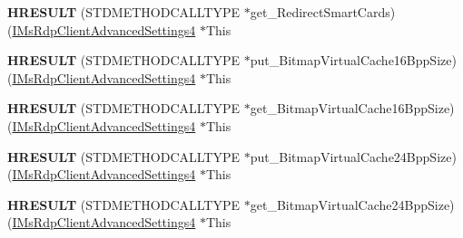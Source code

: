 \begin{DoxyCompactItemize}
{\bfseries H\+R\+E\+S\+U\+LT} (S\+T\+D\+M\+E\+T\+H\+O\+D\+C\+A\+L\+L\+T\+Y\+PE $\ast$get\+\_\+\+Redirect\+Smart\+Cards)(\hyperlink{interface_m_s_t_s_c_lib_1_1_i_ms_rdp_client_advanced_settings4}{I\+Ms\+Rdp\+Client\+Advanced\+Settings4} $\ast$This
\item 
\mbox{\label{struct_m_s_t_s_c_lib_1_1_i_ms_rdp_client_advanced_settings4_vtbl_a013f20454c59a02349435050022f8f77}} 
{\bfseries H\+R\+E\+S\+U\+LT} (S\+T\+D\+M\+E\+T\+H\+O\+D\+C\+A\+L\+L\+T\+Y\+PE $\ast$put\+\_\+\+Bitmap\+Virtual\+Cache16\+Bpp\+Size)(\hyperlink{interface_m_s_t_s_c_lib_1_1_i_ms_rdp_client_advanced_settings4}{I\+Ms\+Rdp\+Client\+Advanced\+Settings4} $\ast$This
\item 
\mbox{\label{struct_m_s_t_s_c_lib_1_1_i_ms_rdp_client_advanced_settings4_vtbl_a509b756a4567d59ac18cf784befe74cb}} 
{\bfseries H\+R\+E\+S\+U\+LT} (S\+T\+D\+M\+E\+T\+H\+O\+D\+C\+A\+L\+L\+T\+Y\+PE $\ast$get\+\_\+\+Bitmap\+Virtual\+Cache16\+Bpp\+Size)(\hyperlink{interface_m_s_t_s_c_lib_1_1_i_ms_rdp_client_advanced_settings4}{I\+Ms\+Rdp\+Client\+Advanced\+Settings4} $\ast$This
\item 
\mbox{\label{struct_m_s_t_s_c_lib_1_1_i_ms_rdp_client_advanced_settings4_vtbl_a2e73d1667290c680a281f8ad2b535bf1}} 
{\bfseries H\+R\+E\+S\+U\+LT} (S\+T\+D\+M\+E\+T\+H\+O\+D\+C\+A\+L\+L\+T\+Y\+PE $\ast$put\+\_\+\+Bitmap\+Virtual\+Cache24\+Bpp\+Size)(\hyperlink{interface_m_s_t_s_c_lib_1_1_i_ms_rdp_client_advanced_settings4}{I\+Ms\+Rdp\+Client\+Advanced\+Settings4} $\ast$This
\item 
\mbox{\label{struct_m_s_t_s_c_lib_1_1_i_ms_rdp_client_advanced_settings4_vtbl_a67d1028c7d84a307bac8b804546fde8c}} 
{\bfseries H\+R\+E\+S\+U\+LT} (S\+T\+D\+M\+E\+T\+H\+O\+D\+C\+A\+L\+L\+T\+Y\+PE $\ast$get\+\_\+\+Bitmap\+Virtual\+Cache24\+Bpp\+Size)(\hyperlink{interface_m_s_t_s_c_lib_1_1_i_ms_rdp_client_advanced_settings4}{I\+Ms\+Rdp\+Client\+Advanced\+Settings4} $\ast$This
\item 
\mbox{\label{struct_m_s_t_s_c_lib_1_1_i_ms_rdp_client_advanced_settings4_vtbl_a0833d14cd3697acd327c845462a57dc2}} 

\end{DoxyCompactItemize}
